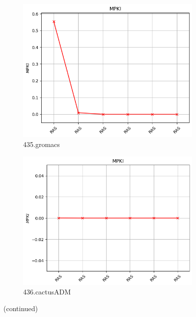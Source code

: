 \documentclass{article}
\begin{document}
\begin{figure}[H]
    \vspace{0.5cm} %

    \begin{subfigure}[b]{0.45\textwidth}
        \includegraphics[width=\textwidth]{figures/5_5/435.gromacs.cslab_branch_preds_ref.out.png}
        \caption{435.gromacs}
        \label{fig:plot71}
    \end{subfigure}
    \hfill
    \begin{subfigure}[b]{0.45\textwidth}
        \includegraphics[width=\textwidth]{figures/5_5/436.cactusADM.cslab_branch_preds_ref.out.png}
        \caption{436.cactusADM}
        \label{fig:plot72}
    \end{subfigure}

    \vspace{0.5cm} %

    \caption{(continued)}
    \label{fig:ras_part2}
\end{figure}
\end{document}
